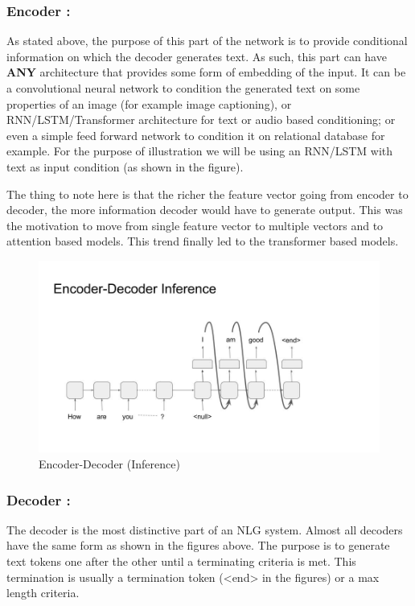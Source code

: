 \documentclass[]{krantz}
\begin{document}
\hypertarget{encoder}{%
\subsubsection{Encoder :}\label{encoder}}

As stated above, the purpose of this part of the network is to provide conditional information on which the decoder generates text. As such, this part can have \textbf{ANY} architecture that provides some form of embedding of the input. It can be a convolutional neural network to condition the generated text on some properties of an image (for example image captioning), or RNN/LSTM/Transformer architecture for text or audio based conditioning; or even a simple feed forward network to condition it on relational database for example. For the purpose of illustration we will be using an RNN/LSTM with text as input condition (as shown in the figure).

The thing to note here is that the richer the feature vector going from encoder to decoder, the more information decoder would have to generate output. This was the motivation to move from single feature vector to multiple vectors and to attention based models. This trend finally led to the transformer based models.

\begin{figure}
\centering
\includegraphics{figures/04-01-use-case1/encoder_decoder_inf.jpg}
\caption{Encoder-Decoder (Inference)}
\end{figure}

\hypertarget{decoder}{%
\subsubsection{Decoder :}\label{decoder}}

The decoder is the most distinctive part of an NLG system. Almost all decoders have the same form as shown in the figures above. The purpose is to generate text tokens one after the other until a terminating criteria is met. This termination is usually a termination token (\textless{}end\textgreater{} in the figures) or a max length criteria.
\end{document}
